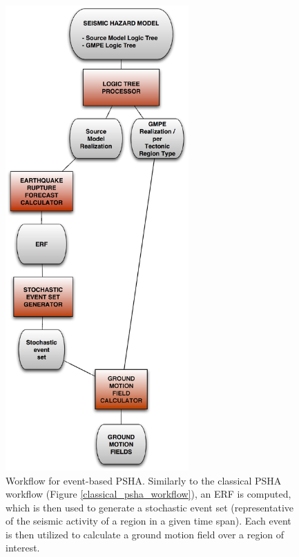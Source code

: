 \begin{figure}[htbp]
\begin{center}
\includegraphics[width=7cm]{./Figures/Part_Hazard/event_based_workflow.eps}
\caption{Workflow for event-based PSHA. Similarly to the classical PSHA workflow (Figure \ref{classical_psha_workflow}), an ERF is computed, which is then used to generate a stochastic event set (representative of the seismic activity of a region in a given time span). Each event is then utilized to calculate a ground motion field over a region of interest.}
\label{event_based_workflow}
\end{center}
\end{figure}
